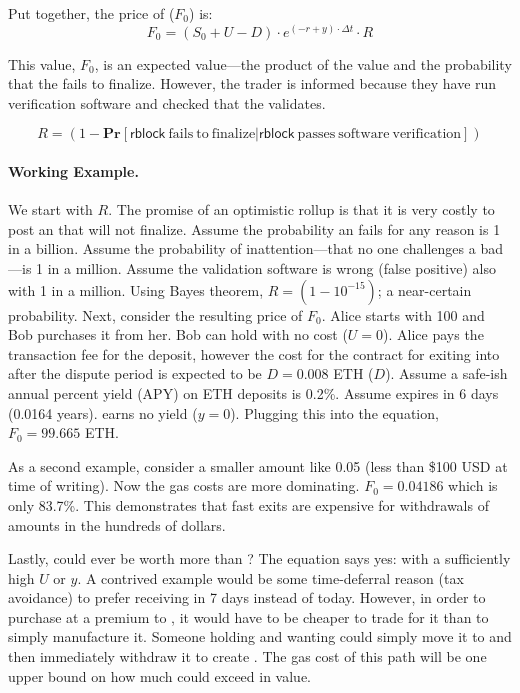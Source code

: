 Put together, the price of \ethxx ($F_0$) is: \[ F_0 = (S_0 + U - D)\cdot e^{(-r+y)\cdot\Delta t} \cdot R \]

This value, $F_0$, is an expected value---the product of the value and the probability that the \rblock fails to finalize. However, the trader is informed because they have run verification software and checked that the \rblock validates.


\[ R = (1-\mathbf{Pr}[ \mathrm{\mathsf{rblock}~fails~to~finalize} |  \mathrm{\mathsf{rblock}~passes~software~verification} ]) \]

\paragraph{Working Example.} We start with $R$. The promise of an optimistic rollup is that it is very costly to post an \rblock that will not finalize. Assume the probability an \rblock fails for any reason is 1 in a billion. Assume the probability of inattention---that no one challenges a bad \rblock---is 1 in a million. Assume the validation software is wrong (false positive) also with 1 in a million. Using Bayes theorem, $R=(1-10^{-15})$; a near-certain probability. Next, consider the resulting price of $F_0$. Alice starts with 100 \ethxx and Bob purchases it from her. Bob can hold \ethxx with no cost ($U=0$). Alice pays the transaction fee for the deposit, however the cost for the contract for exiting \ethxx into \ethone after the dispute period is expected to be $D=0.008$ ETH ($D$). Assume a safe-ish annual percent yield (APY) on ETH deposits is 0.2\%. Assume \ethxx expires in 6 days (0.0164 years). \ethxx earns no yield ($y=0$). Plugging this into the equation, $F_0=99.665$ ETH.

As a second example, consider a smaller amount like 0.05 \ethxx (less than \$100 USD at time of writing). Now the gas costs are more dominating. $F_0=0.04186$ \ethone which is only 83.7\%. This demonstrates that fast exits are expensive for withdrawals of amounts in the hundreds of dollars.

Lastly, could \ethxx ever be worth more than \ethone? The equation says yes: with a sufficiently high $U$ or $y$. A contrived example would be some time-deferral reason (\eg tax avoidance) to prefer receiving \ethone in 7 days instead of today. However, in order to purchase \ethxx at a premium to \ethone, it would have to be cheaper to trade for it than to simply manufacture it. Someone holding \ethone and wanting \ethxx could simply move it to \layertwo and then immediately withdraw it to create \ethxx. The gas cost of this path will be one upper bound on how much \ethxx could exceed \ethone in value. 

